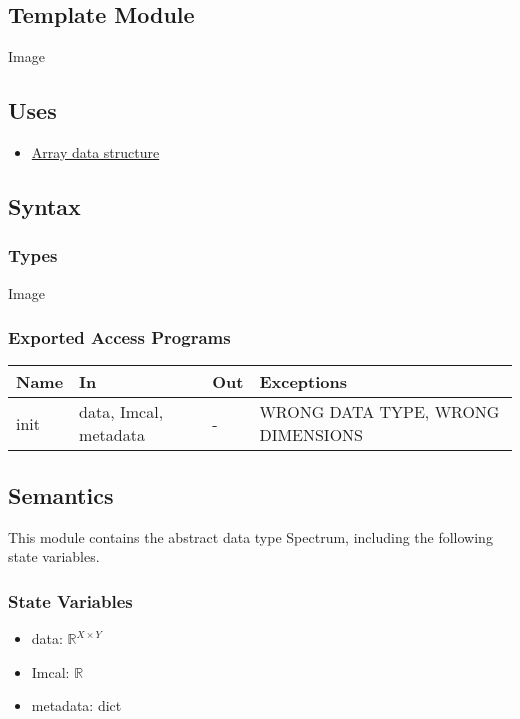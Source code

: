 \documentclass[12pt, titlepage]{article}
\begin{document}
\subsection{Template Module}
Image

\subsection{Uses}
\begin{itemize}
    \item \hyperref[Mod:Array]{Array data structure}
\end{itemize}

\subsection{Syntax}
\subsubsection{Types}
Image

\subsubsection{Exported Access Programs}

\begin{center}
    \begin{tabular}{p{1.5cm} p{4cm} p{4cm} p{4cm}}
        \toprule
        \textbf{Name} & \textbf{In} & \textbf{Out} & \textbf{Exceptions} \\
        \midrule
        init & data, Imcal, metadata & - & WRONG DATA TYPE, WRONG DIMENSIONS \\
        \bottomrule
    \end{tabular}
\end{center}

\subsection{Semantics}
This module contains the abstract data type Spectrum, including the following
state variables.
\subsubsection{State Variables}
\begin{itemize}
    \item data: $\mathbb{R}^{X \times Y}$
    \item Imcal: $\mathbb{R}$
    \item metadata: dict
\end{itemize}
\end{document}
